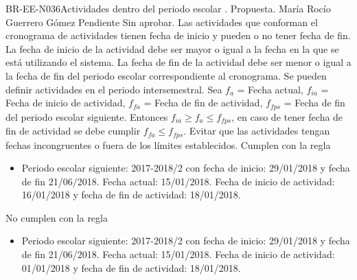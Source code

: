 \begin{BusinessRule}{BR-EE-N036}{Actividades dentro del periodo escolar}
	{\bcIntegridad}    %
	{\btEnabler}     %
	{\blControlling}    %
	.
	\BRItem[Estado] Propuesta.
	 María Rocío Guerrero Gómez
	 Pendiente
	 Sin aprobar.
	\BRItem[Descripción] Las actividades que conforman el cronograma de actividades tienen fecha de inicio y pueden o no tener fecha de fin. La fecha de inicio de la actividad debe ser mayor o igual a la fecha en la que se está utilizando el sistema. La fecha de fin de la actividad debe ser menor o igual a la fecha de fin del periodo escolar correspondiente al cronograma. Se pueden definir actividades en el periodo intersemestral.
	\BRItem[Sentencia]  Sea $f_a$ = Fecha actual, $f_{ia}$ = Fecha de inicio de actividad, $f_{fa}$ = Fecha de fin de actividad, $f_{fps}$ = Fecha de fin del periodo escolar siguiente. Entonces $f_{ia} \geq f_a \leq f_{fps}$, en caso de tener fecha de fin de actividad se debe cumplir $f_{fa} \leq f_{fps}$. 
	\BRItem[Motivación] Evitar que las actividades tengan fechas incongruentes o fuera de los límites establecidos.
	 Cumplen con la regla
	\begin{itemize}
		\item Periodo escolar siguiente: 2017-2018/2 con fecha de inicio: 29/01/2018 y fecha de fin 21/06/2018. Fecha actual: 15/01/2018. Fecha de inicio de actividad: 16/01/2018 y fecha de fin de actividad: 18/01/2018.
	\end{itemize}
	 No cumplen con la regla
	\begin{itemize}
		\item Periodo escolar siguiente: 2017-2018/2 con fecha de inicio: 29/01/2018 y fecha de fin 21/06/2018. Fecha actual: 15/01/2018. Fecha de inicio de actividad: 01/01/2018 y fecha de fin de actividad: 18/01/2018.
	\end{itemize}
\end{BusinessRule}


